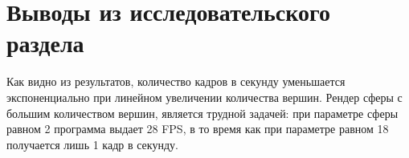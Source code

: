 \section{Выводы из исследовательского раздела}

Как видно из результатов, количество кадров в секунду уменьшается экспоненциально при линейном увеличении количества вершин. Рендер сферы с большим количеством вершин, является трудной задачей: при параметре сферы равном 2 программа
выдает 28 FPS, в то время как при параметре равном 18 получается лишь 1 кадр в секунду.

